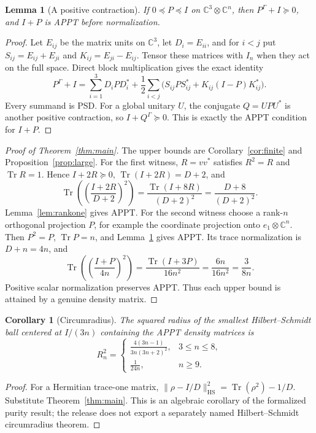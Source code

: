 \documentclass[11pt]{article}
\newtheorem{lemma}[theorem]{Lemma}
\newtheorem{corollary}[theorem]{Corollary}
\theoremstyle{remark}\newtheorem{remark}[theorem]{Remark}
\newcommand{\Tr}{\operatorname{Tr}}
\newcommand{\C}{\mathbb C}
\newcommand{\hs}{\mathrm{HS}}
\begin{document}
\begin{lemma}[A positive contraction]\label{lem:contraction}
If $0\preceq P\preceq I$ on $\C^3\otimes\C^n$, then $P^\Gamma+I\succeq0$, and $I+P$ is APPT before normalization.
\end{lemma}
\begin{proof}
Let $E_{ij}$ be the matrix units on $\C^3$, let $D_i=E_{ii}$, and for $i<j$ put $S_{ij}=E_{ij}+E_{ji}$ and $K_{ij}=E_{ji}-E_{ij}$. Tensor these matrices with $I_n$ when they act on the full space. Direct block multiplication gives the exact identity
\begin{equation}\label{eq:contraction-identity}
 P^\Gamma+I=\sum_{i=1}^3D_iPD_i^*
 +\frac12\sum_{i<j}\bigl(S_{ij}PS_{ij}^*+K_{ij}(I-P)K_{ij}^*\bigr).
\end{equation}
Every summand is PSD. For a global unitary $U$, the conjugate $Q=UPU^*$ is another positive contraction, so $I+Q^\Gamma\succeq0$. This is exactly the APPT condition for $I+P$.
\end{proof}

\begin{proof}[Proof of Theorem~\ref{thm:main}]
The upper bounds are Corollary~\ref{cor:finite} and Proposition~\ref{prop:large}. For the first witness, $R=vv^*$ satisfies $R^2=R$ and $\Tr R=1$. Hence $I+2R\succeq0$, $\Tr(I+2R)=D+2$, and
\[
 \Tr\left(\left(\frac{I+2R}{D+2}\right)^2\right)
 =\frac{\Tr(I+8R)}{(D+2)^2}=\frac{D+8}{(D+2)^2}.
\]
Lemma~\ref{lem:rankone} gives APPT. For the second witness choose a rank-$n$ orthogonal projection $P$, for example the coordinate projection onto $e_1\otimes\C^n$. Then $P^2=P$, $\Tr P=n$, and Lemma~\ref{lem:contraction} gives APPT. Its trace normalization is $D+n=4n$, and
\[
 \Tr\left(\left(\frac{I+P}{4n}\right)^2\right)
 =\frac{\Tr(I+3P)}{16n^2}=\frac{6n}{16n^2}=\frac3{8n}.
\]
Positive scalar normalization preserves APPT. Thus each upper bound is attained by a genuine density matrix.
\end{proof}

\begin{corollary}[Circumradius]\label{cor:radius}
The squared radius of the smallest Hilbert--Schmidt ball centered at $I/(3n)$ containing the APPT density matrices is
\[
 R_n^2=\begin{cases}
 \displaystyle\frac{4(3n-1)}{3n(3n+2)^2},&3\leq n\leq8,\\[5pt]
 \displaystyle\frac1{24n},&n\geq9.
 \end{cases}
\]
\end{corollary}
\begin{proof}
For a Hermitian trace-one matrix, $\|\rho-I/D\|_\hs^2=\Tr(\rho^2)-1/D$. Substitute Theorem~\ref{thm:main}. This is an algebraic corollary of the formalized purity result; the release does not export a separately named Hilbert--Schmidt circumradius theorem.
\end{proof}
\end{document}
